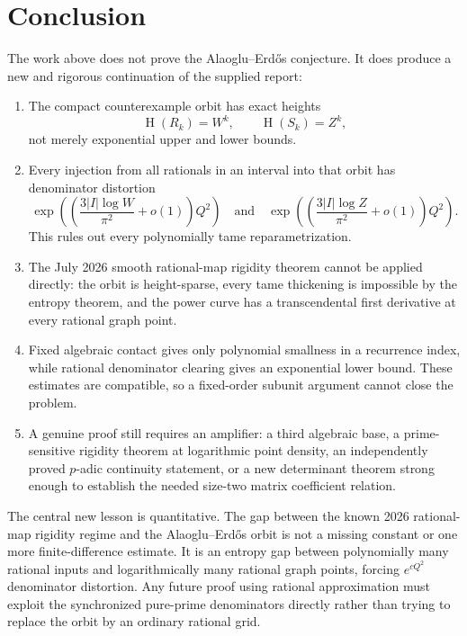 \documentclass[11pt]{article}
\theoremstyle{definition}
\theoremstyle{remark}
\newcommand{\Hgt}{\operatorname{H}}
\begin{document}
\section{Conclusion}
\label{sec:conclusion}

The work above does not prove the Alaoglu--Erd\H{o}s conjecture.  It does produce a new and
rigorous continuation of the supplied report:

\begin{enumerate}[leftmargin=2.2em]
\item The compact counterexample orbit has exact heights
\[
 \Hgt(R_k)=W^k,\qquad \Hgt(S_k)=Z^k,
\]
not merely exponential upper and lower bounds.

\item Every injection from all rationals in an interval into that orbit has denominator
distortion
\[
 \exp\!\left(\left(\frac{3|I|\log W}{\pi^2}+o(1)\right)Q^2\right)
 \quad\text{and}\quad
 \exp\!\left(\left(\frac{3|I|\log Z}{\pi^2}+o(1)\right)Q^2\right).
\]
This rules out every polynomially tame reparametrization.

\item The July 2026 smooth rational-map rigidity theorem cannot be applied directly: the
orbit is height-sparse, every tame thickening is impossible by the entropy theorem, and the
power curve has a transcendental first derivative at every rational graph point.

\item Fixed algebraic contact gives only polynomial smallness in a recurrence index, while
rational denominator clearing gives an exponential lower bound.  These estimates are
compatible, so a fixed-order subunit argument cannot close the problem.

\item A genuine proof still requires an amplifier: a third algebraic base, a prime-sensitive
rigidity theorem at logarithmic point density, an independently proved $p$-adic continuity
statement, or a new determinant theorem strong enough to establish the needed size-two
matrix coefficient relation.
\end{enumerate}

The central new lesson is quantitative.  The gap between the known 2026 rational-map
rigidity regime and the Alaoglu--Erd\H{o}s orbit is not a missing constant or one more
finite-difference estimate.  It is an entropy gap between polynomially many rational inputs
and logarithmically many rational graph points, forcing $e^{cQ^2}$ denominator distortion.
Any future proof using rational approximation must exploit the synchronized pure-prime
denominators directly rather than trying to replace the orbit by an ordinary rational grid.
\end{document}
